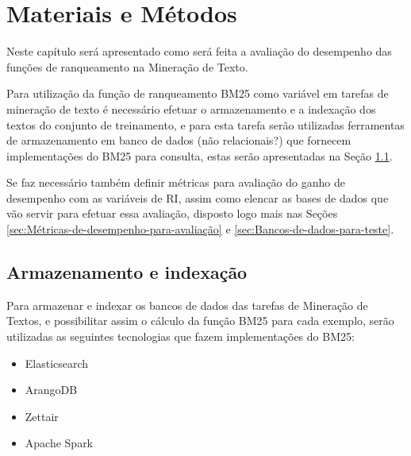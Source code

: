 \chapter{Materiais e Métodos} \label{ch:MateriaisMétodos} %
    Neste capítulo será apresentado como será feita a avaliação do desempenho das funções de ranqueamento na Mineração de Texto.
    
    Para utilização da função de ranqueamento BM25 como variável em tarefas de mineração de texto é necessário efetuar o armazenamento e a indexação dos textos do conjunto de treinamento, e para esta tarefa serão utilizadas ferramentas de armazenamento em banco de dados (não relacionais?) que fornecem implementações do BM25 para consulta, estas serão apresentadas na Seção \ref{sec:Armazenamento-e-indexação}.
    
    Se faz necessário também definir métricas para avaliação do ganho de desempenho com as variáveis de RI, assim como elencar as bases de dados que vão servir para efetuar essa avaliação, disposto logo mais nas Seções \ref{sec:Métricas-de-desempenho-para-avaliação} e \ref{sec:Bancos-de-dados-para-teste}.

\section{Armazenamento e indexação} \label{sec:Armazenamento-e-indexação}

    Para armazenar e indexar os bancos de dados das tarefas de Mineração de Textos, e possibilitar assim o cálculo da função BM25 para cada exemplo, serão utilizadas as seguintes tecnologias que fazem implementações do BM25:
    \begin{itemize}
        \item Elasticsearch %
        \item ArangoDB
        \item Zettair
        \item Apache Spark
    \end{itemize}
    
